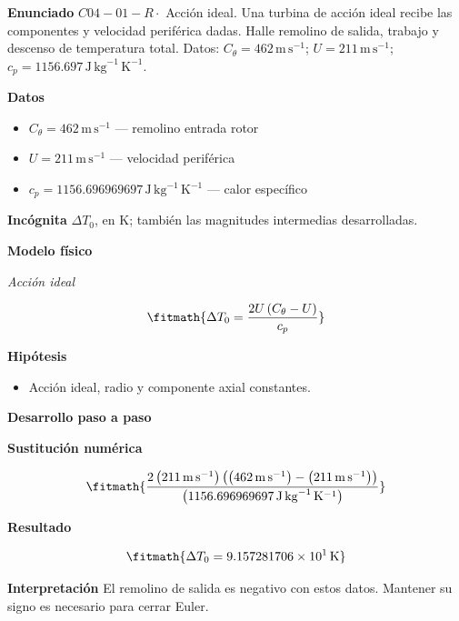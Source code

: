 \documentclass[10pt,openany]{book}
\begin{document}
\begin{tcolorbox}[title={Problema resuelto 1}, studiumworked, breakable]

\noindent\textbf{Enunciado}
\(C04-01-R \cdot\) Acción ideal. Una turbina de acción ideal recibe las componentes y velocidad periférica dadas. Halle remolino de salida, trabajo y descenso de temperatura total. Datos: \(C_\theta=462\, \mathrm{m}\,\mathrm{s}^{-1}\); \(U=211\, \mathrm{m}\,\mathrm{s}^{-1}\); \(c_p=1156.697\, \mathrm{J}\,\mathrm{kg}^{-1}\,\mathrm{K}^{-1}\).

\noindent\textbf{Datos}
\begin{itemize}
\item $C_\theta = 462\,\mathrm{m}\,\mathrm{s}^{-1}$ — remolino entrada rotor
\item $U = 211\,\mathrm{m}\,\mathrm{s}^{-1}$ — velocidad periférica
\item $c_p = 1156.696969697\,\mathrm{J}\,\mathrm{kg}^{-1}\,\mathrm{K}^{-1}$ — calor específico
\end{itemize}

\noindent\textbf{Incógnita}
$\Delta T_0$, en $\mathrm{K}$; también las magnitudes intermedias desarrolladas.

\noindent\textbf{Modelo físico}

\noindent\textit{Acción ideal}

\[
\fitmath{\Delta T_0=\frac{2 U \left(C_\theta - U\right)}{c_p}}
\]

\noindent\textbf{Hipótesis}
\begin{itemize}
\item Acción ideal, radio y componente axial constantes.
\end{itemize}

\noindent\textbf{Desarrollo paso a paso}



\noindent\textbf{Sustitución numérica}

\[
\fitmath{\frac{2 \left(211\,\mathrm{m}\,\mathrm{s}^{-1}\right) \left(\left(462\,\mathrm{m}\,\mathrm{s}^{-1}\right) - \left(211\,\mathrm{m}\,\mathrm{s}^{-1}\right)\right)}{\left(1156.696969697\,\mathrm{J}\,\mathrm{kg}^{-1}\,\mathrm{K}^{-1}\right)}}
\]

\noindent\textbf{Resultado}

\[
\fitmath{\Delta T_0=9.157281706\times10^{1}\,\mathrm{K}}
\]

\noindent\textbf{Interpretación}
El remolino de salida es negativo con estos datos. Mantener su signo es necesario para cerrar Euler.


\end{tcolorbox}
\end{document}
